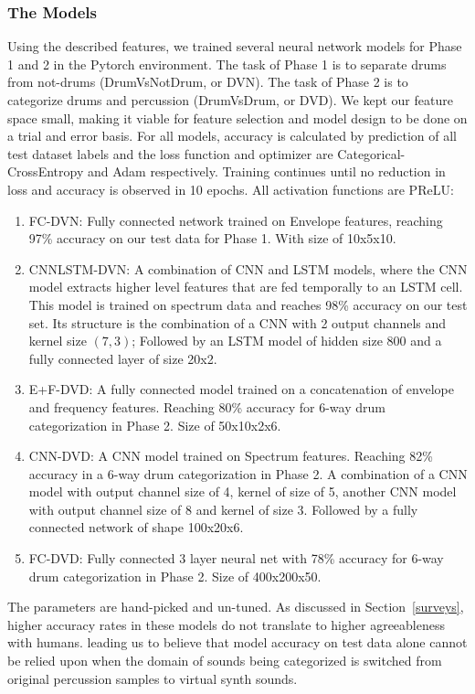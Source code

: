 \documentclass[\main/thesis.tex]{subfiles}
\begin{document}
\subsubsection{The Models}
\label{TPE_models}
Using the described features, we trained several neural network models for Phase 1 and 2 in the Pytorch environment. The task of Phase 1 is to separate drums from not-drums (DrumVsNotDrum, or DVN). The task of Phase 2 is to categorize drums and percussion (DrumVsDrum, or DVD). We kept our feature space small, making it viable for feature selection and model design to be done on a trial and error basis. For all models, accuracy is calculated by prediction of all test dataset labels and the loss function and optimizer are Categorical-CrossEntropy and Adam respectively. Training continues until no reduction in loss and accuracy is observed in 10 epochs.  All activation functions are PReLU:
\begin {enumerate}
\item FC-DVN: Fully connected network trained on Envelope features, reaching 97\% accuracy on our test data for Phase 1. With size of 10x5x10.
\item CNNLSTM-DVN: A combination of CNN and LSTM models, where the CNN model extracts higher level features that are fed temporally to an LSTM cell. This model is trained on spectrum data and reaches 98\% accuracy on our test set. Its structure is the combination of a CNN with 2 output channels and kernel size $(7,3)$; Followed by an LSTM model of hidden size 800 and a fully connected layer of size 20x2.
\item E+F-DVD: A fully connected model trained on a concatenation of envelope and frequency features. Reaching 80\% accuracy for 6-way drum categorization in Phase 2. Size of 50x10x2x6.
\item CNN-DVD: A CNN model trained on Spectrum features. Reaching 82\% accuracy in a 6-way drum categorization in Phase 2. A combination of a CNN model with output channel size of 4, kernel of size of 5, another CNN model with output channel size of 8 and kernel of size 3. Followed by a fully connected network of shape 100x20x6.
\item FC-DVD: Fully connected 3 layer neural net with 78\% accuracy for 6-way drum categorization in Phase 2. Size of 400x200x50.
\end{enumerate}
The parameters are hand-picked and un-tuned. As discussed in Section~\ref{surveys}, higher accuracy rates in these models do not translate to higher agreeableness with humans. leading us to believe that model accuracy on test data alone cannot be relied upon when the domain of sounds 
being categorized is switched from original percussion samples to virtual synth sounds.
\end{document}
